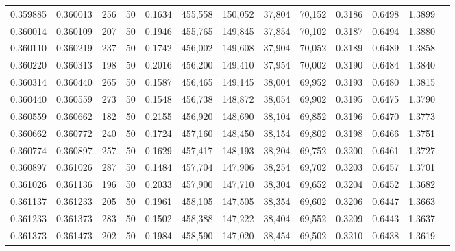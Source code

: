 \begin{tabular}{rrrrrrrrrrrrr}
0.359885 & 0.360013 &   256 &  50 &                                     0.1634 & 455,558 & 150,052 &  37,804 &  70,152 & 0.3186 & 0.6498 & 1.3899 \\
0.360014 & 0.360109 &   207 &  50 &                                     0.1946 & 455,765 & 149,845 &  37,854 &  70,102 & 0.3187 & 0.6494 & 1.3880 \\
0.360110 & 0.360219 &   237 &  50 &                                     0.1742 & 456,002 & 149,608 &  37,904 &  70,052 & 0.3189 & 0.6489 & 1.3858 \\
0.360220 & 0.360313 &   198 &  50 &                                     0.2016 & 456,200 & 149,410 &  37,954 &  70,002 & 0.3190 & 0.6484 & 1.3840 \\
0.360314 & 0.360440 &   265 &  50 &                                     0.1587 & 456,465 & 149,145 &  38,004 &  69,952 & 0.3193 & 0.6480 & 1.3815 \\
0.360440 & 0.360559 &   273 &  50 &                                     0.1548 & 456,738 & 148,872 &  38,054 &  69,902 & 0.3195 & 0.6475 & 1.3790 \\
0.360559 & 0.360662 &   182 &  50 &                                     0.2155 & 456,920 & 148,690 &  38,104 &  69,852 & 0.3196 & 0.6470 & 1.3773 \\
0.360662 & 0.360772 &   240 &  50 &                                     0.1724 & 457,160 & 148,450 &  38,154 &  69,802 & 0.3198 & 0.6466 & 1.3751 \\
0.360774 & 0.360897 &   257 &  50 &                                     0.1629 & 457,417 & 148,193 &  38,204 &  69,752 & 0.3200 & 0.6461 & 1.3727 \\
0.360897 & 0.361026 &   287 &  50 &                                     0.1484 & 457,704 & 147,906 &  38,254 &  69,702 & 0.3203 & 0.6457 & 1.3701 \\
0.361026 & 0.361136 &   196 &  50 &                                     0.2033 & 457,900 & 147,710 &  38,304 &  69,652 & 0.3204 & 0.6452 & 1.3682 \\
0.361137 & 0.361233 &   205 &  50 &                                     0.1961 & 458,105 & 147,505 &  38,354 &  69,602 & 0.3206 & 0.6447 & 1.3663 \\
0.361233 & 0.361373 &   283 &  50 &                                     0.1502 & 458,388 & 147,222 &  38,404 &  69,552 & 0.3209 & 0.6443 & 1.3637 \\
0.361373 & 0.361473 &   202 &  50 &                                     0.1984 & 458,590 & 147,020 &  38,454 &  69,502 & 0.3210 & 0.6438 & 1.3619 \\

\end{tabular}
